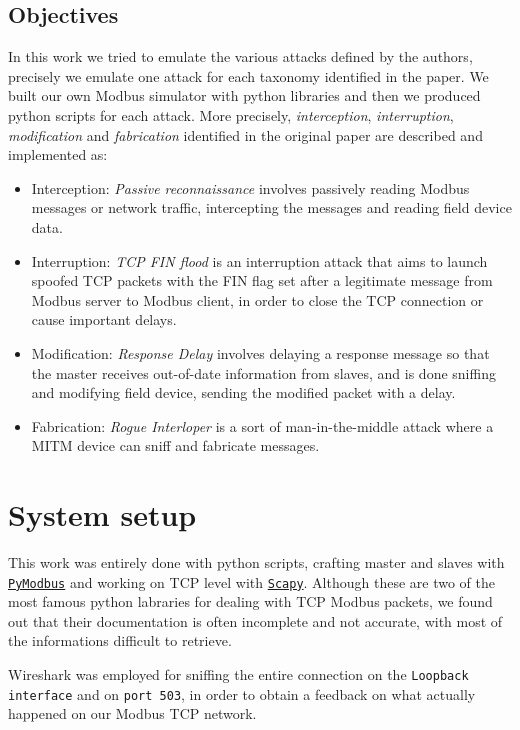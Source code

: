\documentclass[12pt]{article}
\begin{document}
\subsection{Objectives}
In this work we tried to emulate the various attacks defined by the authors, precisely we emulate one attack for each taxonomy identified in the paper. We built our own Modbus simulator with python libraries and then we produced python scripts for each attack.
More precisely, \textit{interception}, \textit{interruption}, \textit{modification} and \textit{fabrication} identified in the original paper are described and implemented as:
\begin{itemize}
    \item Interception: \textit{Passive reconnaissance} involves passively reading Modbus messages or network traffic, intercepting the messages and reading field device data.
    \item Interruption: \textit{TCP FIN flood} is an interruption attack that aims to launch spoofed TCP packets with the FIN flag set after a legitimate message from Modbus server to Modbus client, in order to close the TCP connection or cause important delays.
    \item Modification: \textit{Response Delay} involves delaying a response message so that the master receives out-of-date information from slaves, and is done sniffing and modifying field device, sending the modified packet with a delay.
    \item Fabrication: \textit{Rogue Interloper} is a sort of man-in-the-middle attack where a MITM device can sniff and fabricate messages.
\end{itemize}

\section{System setup}
This work was entirely done with python scripts, crafting master and slaves with \href{https://pymodbus.readthedocs.io/en/latest/}{\texttt{PyModbus}} and working on TCP level with \href{https://scapy.readthedocs.io/en/latest/}{\texttt{Scapy}}.
Although these are two of the most famous python labraries for dealing with TCP Modbus packets, we found out that their documentation is often incomplete and not accurate, with most of the informations difficult to retrieve. 

Wireshark was employed for sniffing the entire connection on the \texttt{Loopback interface} and on \texttt{port 503}, in order to obtain a feedback on what actually happened on our Modbus TCP network.
\end{document}
